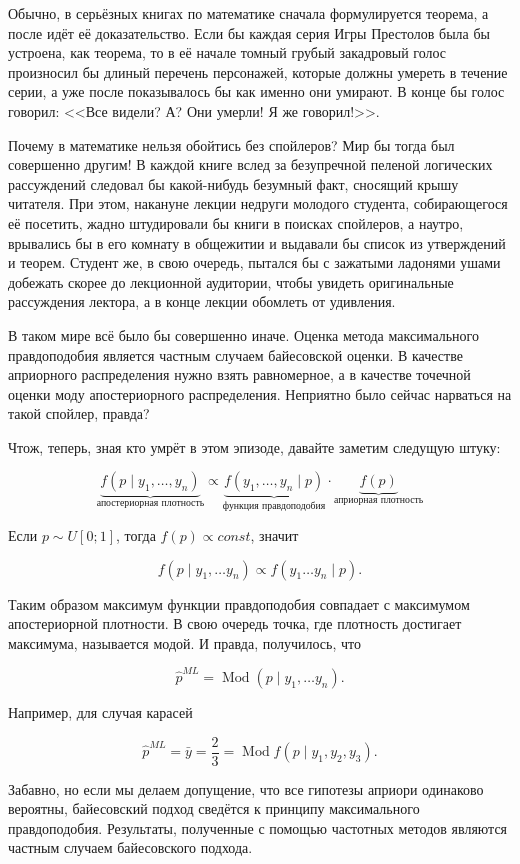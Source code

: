 \documentclass[12pt, a4paper, oneside]{extreport}
\DeclareMathOperator{\Mod}{Mod}
\theoremstyle{plain}              %
\theoremstyle{definition}         %
\begin{document}
Обычно, в серьёзных книгах по математике сначала формулируется теорема, а после идёт её доказательство. Если бы каждая серия Игры Престолов была бы устроена, как теорема, то в её начале томный грубый закадровый голос произносил бы длиный перечень персонажей, которые должны умереть в течение серии, а уже после показывалось бы как именно они умирают. В конце бы голос говорил: <<Все видели? А? Они умерли! Я же говорил!>>.

Почему в математике нельзя обойтись без спойлеров? Мир бы тогда был совершенно другим! В каждой книге вслед за безупречной пеленой логических рассуждений следовал бы какой-нибудь безумный факт, сносящий крышу читателя. При этом, накануне лекции недруги молодого студента, собирающегося её посетить, жадно штудировали бы книги в поисках спойлеров, а наутро, врывались бы в его комнату в общежитии и выдавали бы список из утверждений и теорем. Студент же, в свою очередь, пытался бы с зажатыми ладонями ушами добежать скорее до лекционной аудитории, чтобы увидеть оригинальные рассуждения лектора, а в конце лекции обомлеть от удивления.

В таком мире всё было бы совершенно иначе. Оценка метода максимального правдоподобия является частным случаем байесовской оценки. В качестве априорного распределения нужно взять равномерное, а в качестве точечной оценки моду апостериорного распределения. Неприятно было сейчас нарваться на такой спойлер, правда?

Чтож, теперь, зная кто умрёт в этом эпизоде, давайте заметим следущую штуку:

\[ \underbrace{f(p \mid y_1, \ldots, y_n)}_{\text{апостериорная плотность}} \propto \underbrace{f(y_1, \ldots, y_n \mid p)}_{\text{функция правдоподобия}} \cdot \underbrace{f(p)}_{\text{априорная плотность}} \]  

Если $p \sim U[0;1]$, тогда $f(p) \propto const$, значит 

\[f(p \mid y_1, \ldots y_n) \propto f(y_1 \ldots y_n \mid p).\] 

Таким образом максимум функции правдоподобия совпадает с максимумом апостериорной плотности. В свою очередь точка, где плотность достигает максимума, называется модой.
И правда, получилось,  что

\[\hat p^{ML} = \Mod(p \mid y_1, \ldots y_n). \]

Например, для случая карасей

\[ \hat p^{ML} = \bar{y} = \frac{2}{3} = \Mod f(p \mid y_1,y_2,y_3). \]

Забавно, но если мы делаем допущение, что все гипотезы априори одинаково вероятны, байесовский подход сведётся к принципу максимального правдоподобия. Результаты, полученные с помощью частотных методов являются частным случаем байесовского подхода. 
\end{document}
